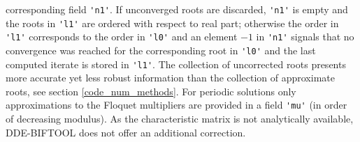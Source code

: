\documentclass[10pt]{scrartcl}
\newcommand{\DDEBIFCODE}{\textsc{DDE-BIFTOOL}}
\newcommand{\blist}[1]{\mbox{\lstinline!#1!}}
\begin{document}
corresponding field \blist{'n1'}.  If unconverged roots are discarded,
\blist{'n1'} is empty and the roots in \blist{'l1'} are ordered with
respect to real part; otherwise the order in \blist{'l1'} corresponds
to the order in \blist{'l0'} and an element $-1$ in \blist{'n1'}
signals that no convergence was reached for the corresponding root in
\blist{'l0'} and the last computed iterate is stored in \blist{'l1'}.
The collection of uncorrected roots presents more accurate yet less
robust information than the collection of approximate roots, see
section \ref{code_num_methods}. For periodic solutions only
approximations to the Floquet multipliers are provided in a field
\blist{'mu'} (in order of decreasing modulus). As the characteristic
matrix is not analytically available, \DDEBIFCODE{} does not offer an
additional correction.
\end{document}

